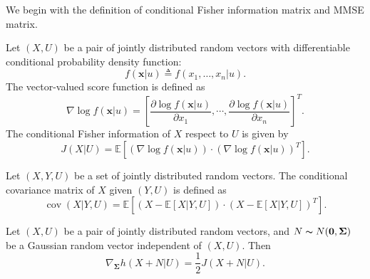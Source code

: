 \documentclass[journal,final, onecolumn]{IEEEtran}
\DeclareMathOperator{\cov}{cov}
\begin{document}
We begin with the definition of conditional Fisher information matrix and MMSE matrix.
\smallskip
\begin{definition}
Let $({X}, U)$ be a pair of jointly distributed random vectors with differentiable conditional probability density function:
\begin{equation}
f(\boldsymbol{x}|u) \triangleq f(x_{1},\ldots,x_{n}|u).
\end{equation}
The vector-valued score function is defined as
\begin{equation}
\nabla \log f(\boldsymbol{x}| u)  = \left[\frac{\partial \log f(\boldsymbol{x}| u)}{\partial x_{1}}, \cdots, \frac{\partial \log f(\boldsymbol{x}| u)}{\partial x_{n}} \right]^{T}.
\end{equation}
The conditional Fisher information of $X$ respect to $U$ is given by
\begin{equation}
J(X| U) = \mathbb{E}\left[  \left(\nabla \log f(\boldsymbol{x}| u) \right) \cdot \left(\nabla \log f(\boldsymbol{x} | u) \right)^{T}    \right ].
\end{equation}
\end{definition}

\smallskip
\begin{definition}\label{def_MMSE}
Let $(X,Y,U)$ be a set of jointly distributed random vectors. The conditional covariance matrix of $X$ given $(Y,U)$ is defined as
\begin{equation}
\cov (X|Y,U) = \mathbb{E}\left[    \left( X - \mathbb{E}[X|Y,U] \right)  \cdot    \left( X - \mathbb{E}[X|Y,U] \right)^{T}           \right].
\end{equation}
\end{definition}

\smallskip
\begin{lemma} \label{de}
Let $({X}, U)$ be a pair of jointly distributed random vectors, and ${N} \thicksim {N}(\mathbf{0}, \boldsymbol{\Sigma})$ be a Gaussian random vector independent of  $({X}, U)$. Then
 \begin{equation}
 \nabla_{\boldsymbol{\Sigma} }h({X}+  {N} | U) = \frac{1}{2}  J ({X}+{N} | U) . \label{eq:de}
 \end{equation}
\end{lemma}
\end{document}
